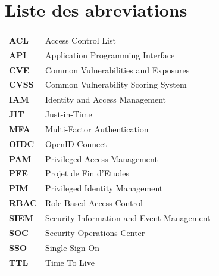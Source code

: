 \chapter*{Liste des abreviations}

\begin{longtable}{>{\bfseries}p{} p{}}
ACL & Access Control List \\
API & Application Programming Interface \\
CVE & Common Vulnerabilities and Exposures \\
CVSS & Common Vulnerability Scoring System \\
IAM & Identity and Access Management \\
JIT & Just-in-Time \\
MFA & Multi-Factor Authentication \\
OIDC & OpenID Connect \\
PAM & Privileged Access Management \\
PFE & Projet de Fin d'Etudes \\
PIM & Privileged Identity Management \\
RBAC & Role-Based Access Control \\
SIEM & Security Information and Event Management \\
SOC & Security Operations Center \\
SSO & Single Sign-On \\
TTL & Time To Live \\
\end{longtable}

\clearpage
